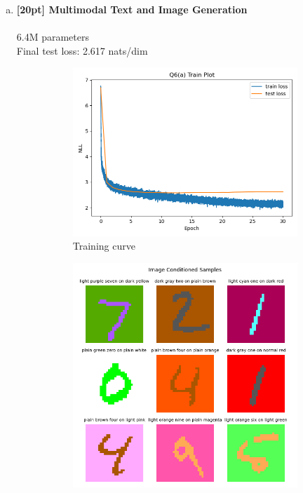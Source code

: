 \documentclass{article}
\begin{document}
\begin{enumerate}[(a)]
\item {\bf [20pt] Multimodal Text and Image Generation} \\\\
6.4M parameters \\
Final test loss: 2.617 nats/dim
\begin{figure}[H]
    \centering
    \begin{subfigure}{0.45\textwidth}
        \centering
        \includegraphics[width=\textwidth]{figures/q6_a_train_plot.png}
        \caption{Training curve}
    \end{subfigure}
    \hspace{0.2in}
    \begin{subfigure}{0.45\textwidth}
        \centering
        \includegraphics[width=\textwidth]{figures/q6_a_samples_img_conditioned.png}

\end{subfigure}
\end{figure}
\end{enumerate}
\end{document}
